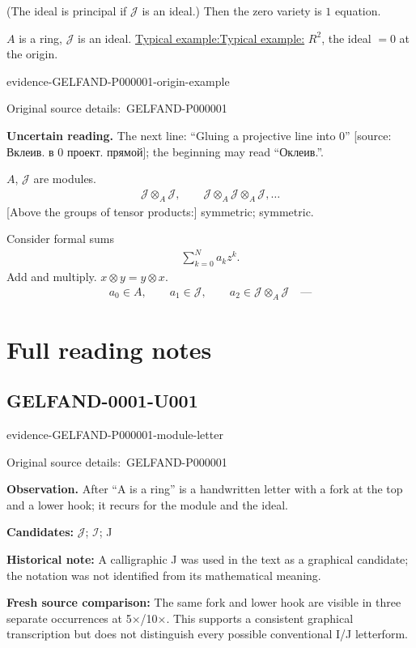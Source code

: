 \documentclass[11pt]{article}
\let\MathUnderline\underline
\renewcommand{\underline}[1]{\ifmmode\MathUnderline{#1}\else\uline{#1}\fi}
\newcommand{\EvidenceBlock}[4]{%
 \par\smallskip\noindent\begin{minipage}{\linewidth}
 \begin{minipage}[t]{.47\linewidth}\vspace{0pt}\centering
 \csname evidence-#1-#2\endcsname\par
 {\scriptsize\SourceCropCaption\ #1}\par
 \end{minipage}\hfill
 \begin{minipage}[t]{.49\linewidth}\vspace{0pt}\raggedright
 {\small\color{orange!65!black}\textbf{#4} #3}\par
 \end{minipage}
 \end{minipage}\par\smallskip}
\newcommand{\Unclear}[3]{\EvidenceBlock{#1}{#2}{#3}{\ReadingCaption}}
\newcommand{\SourceCropCaption}{Original source details:}\newcommand{\ReadingCaption}{Uncertain reading.}\newcommand{\IncompleteCaption}{Undeciphered passage.}\newcommand{\DiagramCaption}{Diagram and typed description.}
\begin{document}
(The ideal is principal if $\mathcal{J}$ is an ideal.)
Then the zero variety is $1$ equation.

$A$ is a ring, $\mathcal{J}$ is an ideal.
\underline{Typical example:} $R^2$, the ideal $=0$ at the origin.
\Unclear{GELFAND-P000001}{origin-example}{The next line: ``Gluing a projective line into $0$'' [source: Вклеив. в $0$ проект. прямой]; the beginning may read ``Оклеив.''.}

$A$, $\mathcal{J}$ are modules.
\begin{gather*}
 \mathcal{J}\otimes_A\mathcal{J},\qquad
 \mathcal{J}\otimes_A\mathcal{J}\otimes_A\mathcal{J},\ldots
\end{gather*}
[Above the groups of tensor products:] symmetric; symmetric.

Consider formal sums
\begin{gather*}
 \sum_{k=0}^{N}a_kz^k.
\end{gather*}
Add and multiply.
$x\otimes y=y\otimes x$.
\begin{gather*}
 a_0\in A,\qquad a_1\in\mathcal{J},\qquad
 a_2\in\mathcal{J}\otimes_A\mathcal{J}\quad\text{—}
\end{gather*}



\clearpage\section*{Full reading notes}
\subsection*{GELFAND-0001-U001}
\EvidenceBlock{GELFAND-P000001}{module-letter}{After “A is a ring” is a handwritten letter with a fork at the top and a lower hook; it recurs for the module and the ideal.}{Observation.}
\textbf{Candidates: } \(\mathcal{J}\); \(\mathcal{I}\); J\par
\textbf{Historical note: } A calligraphic J was used in the text as a graphical candidate; the notation was not identified from its mathematical meaning.\par
\textbf{Fresh source comparison: } The same fork and lower hook are visible in three separate occurrences at 5×/10×. This supports a consistent graphical transcription but does not distinguish every possible conventional I/J letterform.\par
\end{document}
